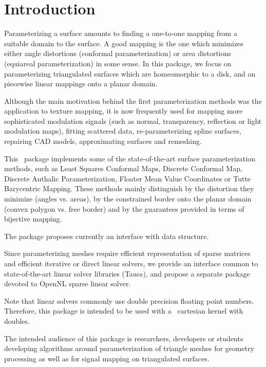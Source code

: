 \section{Introduction}

Parameterizing a surface amounts to finding a one-to-one mapping from
a suitable domain to the surface. A good mapping is the one which
minimizes either angle distortions (conformal parameterization) or
area distortions (equiareal parameterization) in some sense.  In this
package, we focus on parameterizing triangulated surfaces which are
homeomorphic to a disk, and on piecewise linear mappings onto a planar
domain.

Although the main motivation behind the first parameterization methods
was the application to texture mapping, it is now frequently used for
mapping more sophisticated modulation signals (such as normal,
transparency, reflection or light modulation maps), fitting scattered
data, re-parameterizing spline surfaces, repairing CAD models,
approximating surfaces and remeshing.

This \cgal\ package implements some of the state-of-the-art
surface parameterization methods, such as Least Squares Conformal Maps,
Discrete Conformal Map, Discrete Authalic
Parameterization, Floater Mean Value Coordinates or Tutte Barycentric
Mapping. These methods mainly distinguish by the distortion they
minimize (angles vs. areas), by the constrained border onto the
planar domain (convex polygon vs. free border) and by the guarantees
provided in terms of bijective mapping.

The package proposes currently an interface with 
data structure.

Since parameterizing meshes require efficient representation of sparse
matrices and efficient iterative or direct linear solvers, we provide
an interface common to state-of-the-art linear solver libraries ({\sc Taucs}),
and propose a separate package devoted to OpenNL sparse
linear solver.

Note that linear solvers commonly use double precision floating point
numbers. Therefore, this package is intended to be used with a \cgal\
cartesian kernel with doubles.

The intended audience of this package is researchers, developers or
students developing algorithms around parameterization of triangle
meshes for geometry processing as well as for signal mapping on
triangulated surfaces.

